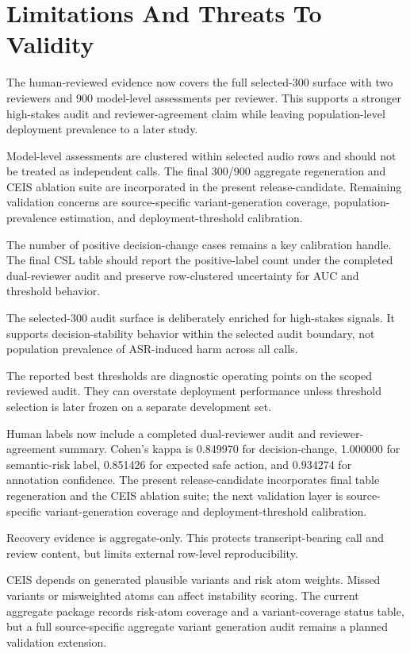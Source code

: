 \documentclass[
]{article}
\begin{document}
\hypertarget{limitations-and-threats-to-validity}{%
\section{Limitations And Threats To
Validity}\label{limitations-and-threats-to-validity}}

The human-reviewed evidence now covers the full selected-300 surface
with two reviewers and 900 model-level assessments per reviewer. This
supports a stronger high-stakes audit and reviewer-agreement claim while
leaving population-level deployment prevalence to a later study.

Model-level assessments are clustered within selected audio rows and
should not be treated as independent calls. The final 300/900 aggregate
regeneration and CEIS ablation suite are incorporated in the present
release-candidate. Remaining validation concerns are source-specific
variant-generation coverage, population-prevalence estimation, and
deployment-threshold calibration.

The number of positive decision-change cases remains a key calibration
handle. The final CSL table should report the positive-label count under
the completed dual-reviewer audit and preserve row-clustered uncertainty
for AUC and threshold behavior.

The selected-300 audit surface is deliberately enriched for high-stakes
signals. It supports decision-stability behavior within the selected
audit boundary, not population prevalence of ASR-induced harm across all
calls.

The reported best thresholds are diagnostic operating points on the
scoped reviewed audit. They can overstate deployment performance unless
threshold selection is later frozen on a separate development set.

Human labels now include a completed dual-reviewer audit and
reviewer-agreement summary. Cohen's kappa is 0.849970 for
decision-change, 1.000000 for semantic-risk label, 0.851426 for
expected safe action, and 0.934274 for annotation confidence. The
present release-candidate incorporates final table regeneration and the
CEIS ablation suite; the next validation layer is source-specific
variant-generation coverage and deployment-threshold calibration.

Recovery evidence is aggregate-only. This protects transcript-bearing
call and review content, but limits external row-level reproducibility.

CEIS depends on generated plausible variants and risk atom weights.
Missed variants or misweighted atoms can affect instability scoring. The
current aggregate package records risk-atom coverage and a
variant-coverage status table, but a full source-specific aggregate
variant generation audit remains a planned validation extension.
\end{document}
